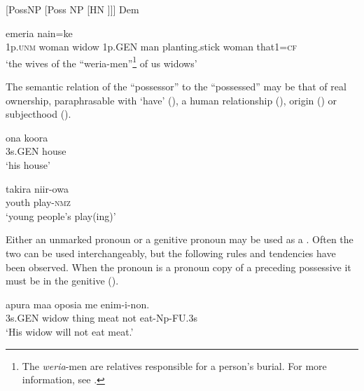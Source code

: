\ea{}
[PossNP          [Poss NP            [HN ]]]   Dem 
\z

\ea%
\label{ex:x405}
\gll {}        emeria  nain=ke \\
   1p.\textsc{unm}  woman  widow  1p.GEN  man  planting.stick  woman  that1=\textsc{cf}   \\
\glt`the wives of the ``weria-men''\footnote{The \textit{weria}-men are relatives responsible for a person's burial. For more information, see .} of us widows'
\z





The semantic relation of the ``possessor'' to the ``possessed'' may be that of real ownership, paraphrasable with `have' (), a human relationship (), origin () or subjecthood (). 

\ea%
\label{ex:x406}
\gll ona  koora \\
    3s.GEN  house  \\
\glt`his house'
\z





\ea%
\label{ex:x407}
\gll takira  niir-owa \\
  youth  play-\textsc{nmz}    \\
\glt`young  people's play(ing)'
\z





Either an unmarked pronoun or a genitive pronoun may be used as a . Often the two can be used interchangeably, but the following rules and tendencies have been observed. When the pronoun is a pronoun copy of a preceding possessive  it must be in the genitive (). 

\ea%
\label{ex:x409}
\gll {}  apura  maa  oposia  me  enim-i-non. \\
  3s.GEN  widow  thing  meat  not  eat-Np-FU.3s    \\
\glt`His widow will not eat meat.'
\z





